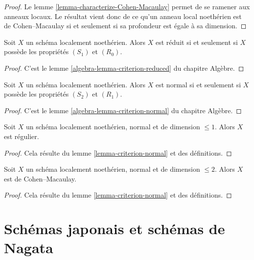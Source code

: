 \begin{proof}
Le lemme \ref{lemma-characterize-Cohen-Macaulay}
permet de se ramener aux anneaux locaux.
Le résultat vient donc de ce qu'un anneau local noethérien est de Cohen--Macaulay
si et seulement si sa profondeur est égale à sa dimension.
\end{proof}

\begin{lemma}
\label{lemma-criterion-reduced}
Soit $X$ un schéma localement noethérien.
Alors $X$ est réduit si et seulement si $X$ possède les propriétés $(S_1)$ et $(R_0)$.
\end{lemma}

\begin{proof}
C'est le lemme \ref{algebra-lemma-criterion-reduced} du chapitre Algèbre.
\end{proof}

\begin{lemma}
\label{lemma-criterion-normal}
Soit $X$ un schéma localement noethérien.
Alors $X$ est normal si et seulement si $X$ possède les propriétés $(S_2)$ et $(R_1)$.
\end{lemma}

\begin{proof}
C'est le lemme \ref{algebra-lemma-criterion-normal} du chapitre Algèbre.
\end{proof}

\begin{lemma}
\label{lemma-normal-dimension-1-regular}
Soit $X$ un schéma localement noethérien, normal et
de dimension $\leq 1$. Alors $X$ est régulier.
\end{lemma}

\begin{proof}
Cela résulte du lemme \ref{lemma-criterion-normal} et des définitions.
\end{proof}

\begin{lemma}
\label{lemma-normal-dimension-2-Cohen-Macaulay}
Soit $X$ un schéma localement noethérien, normal et
de dimension $\leq 2$. Alors $X$ est de Cohen--Macaulay.
\end{lemma}

\begin{proof}
Cela résulte du lemme \ref{lemma-criterion-normal} et des définitions.
\end{proof}

\section{Schémas japonais et schémas de Nagata}
\label{section-nagata}

